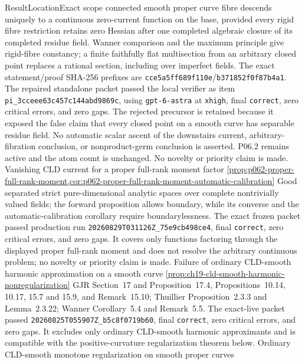 \begin{AppLProvenanceLedger}{Result}{Location}{Exact scope}
{   connected smooth proper curve fibre descends uniquely to a continuous
   zero-current function on the base, provided every rigid fibre
   restriction retains zero Hessian after one completed algebraic closure
   of its completed residue field.  Wanner comparison and the maximum
   principle give rigid-fibre constancy; a finite faithfully flat
   multisection from an arbitrary closed point replaces a rational section,
   including over imperfect fields.  The exact statement/proof SHA-256
   prefixes are
   \texttt{cce5a5ff689f110e}/\texttt{b371852f0f87b4a1}.  The repaired
   standalone packet passed the local verifier as item
   \nolinkurl{pi_3cceee63c457c144abd9869c}, using
   \texttt{gpt-6-astra} at \texttt{xhigh}, final \texttt{correct}, zero
   critical errors, and zero gaps.  The rejected precursor is retained
   because it exposed the false claim that every closed point on a smooth
   curve has separable residue field.  No automatic scalar ascent of the
   downstairs current, arbitrary-fibration conclusion, or nonproduct-germ
   conclusion is asserted.  P06.2 remains active and the atom count is
   unchanged.  No novelty or priority claim is made.}
\AppLProvenanceRecord
  {Vanishing CLD current for a proper full-rank moment factor}
  {\cref{prop:p062-proper-full-rank-moment,cor:p062-proper-full-rank-moment-automatic-calibration}}
  {Good separated strict pure-dimensional analytic spaces over complete
   nontrivially valued fields; the forward proposition allows boundary, while
   its converse and the automatic-calibration corollary require
   boundarylessness.  The exact frozen packet passed production run
   \nolinkurl{20260829T031126Z_75e9cb498ce4}, final \texttt{correct}, zero
   critical errors, and zero gaps.  It covers only functions factoring
   through the displayed proper full-rank moment and does not resolve the
   arbitrary continuous problem; no novelty or priority claim is made.}
\AppLProvenanceRecord
  {Failure of ordinary CLD-smooth harmonic approximation on a smooth curve}
  {\cref{prop:ch19-cld-smooth-harmonic-nonregularization}}
  {GJR Section~17 and Proposition~17.4, Propositions~10.14, 10.17, 15.7 and
   15.9, and Remark~15.10; Thuillier Proposition~2.3.3 and
   Lemma~2.3.22; Wanner Corollary~5.4 and Remark~5.5.  The exact-live packet
   passed \nolinkurl{20260825T055907Z_b5c8f0719b60}, final
   \texttt{correct}, zero critical errors, and zero gaps.  It excludes only
   ordinary CLD-smooth harmonic approximants and is compatible with the
   positive-curvature regularization theorem below.}
\AppLProvenanceRecord
  {Ordinary CLD-smooth monotone regularization on smooth proper curves}

\end{AppLProvenanceLedger}
